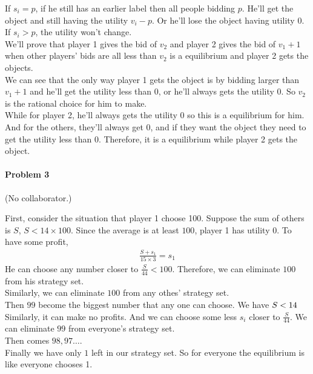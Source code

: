 \documentclass[12pt]{article}
\begin{document}
\begin{enumerate}
              If $s_i = p$, if he still has an earlier label then all people bidding $p$.
              He'll get the object and still having the utility $v_i - p$.
              Or he'll lose the object having utility 0. 
              If $s_i > p$, the utility won't change. \\
              We'll prove that player 1 gives the bid of $v_2$ and player 2 gives the bid of $v_1 + 1$ 
              when other players' bids are all less than $v_2$ is a equilibrium and player 2 gets the objects.\\
              We can see that the only way player 1 gets the object is by bidding larger than $v_1 + 1$
              and he'll get the utility less than 0, or he'll always gets the utility 0. 
              So $v_2$ is the rational choice for him to make. \\
              While for player 2, he'll always gets the utility 0 so this is a equilibrium for him.
              And for the others, they'll always get 0, and if they want the object 
              they need to get the utility less than 0.
              Therefore, it is a equilibrium while player 2 gets the object.
              



\end{enumerate}

\bigskip

\paragraph{Problem 3} (No collaborator.)

First, consider the situation that player 1 choose 100.
Suppose the sum of others is $S$, $S < 14 \times 100$.
Since the average is at least $100$, player 1 has utility $0$.
To have some profit, 
\begin{align*}
   \frac{S + s_1}{15\times3} = s_1
\end{align*}
He can choose any number closer to $\frac{S}{44} < 100$.
Therefore, we can eliminate $100$ from his strategy set.\\
Similarly, we can eliminate $100$ from any othes' strategy set. \\
Then $99$ become the biggest number that any one can choose.
We have $S < 14 \time 99$
Similarly, it can make no profits.
And we can choose some less $s_i$ closer to $\frac{S}{44}$.
We can eliminate $99$ from everyone's strategy set. \\
Then comes $98,97 \ldots$. \\
Finally we have only $1$ left in our strategy set.
So for everyone the equilibrium is like everyone chooses 1.
\end{document}
